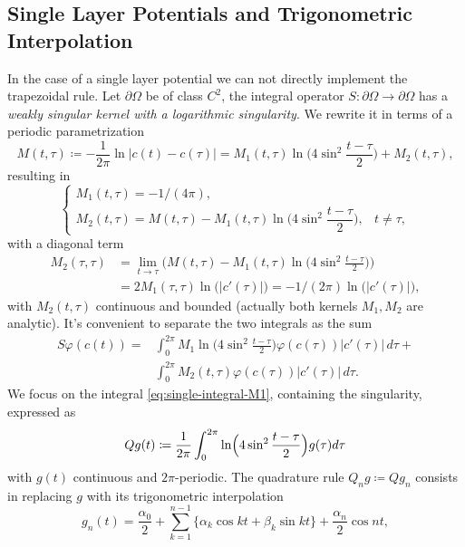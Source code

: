 \documentclass[10pt, a4paper, twoside, openright]{book}
\theoremstyle{definition}
\theoremstyle{plain}
\theoremstyle{plain}
\theoremstyle{plain}
\theoremstyle{plain}
\theoremstyle{plain}
\theoremstyle{plain}
\theoremstyle{plain}
\theoremstyle{plain}
\let\phi\varphi
\begin{document}
\subsection{Single Layer Potentials and Trigonometric Interpolation}
In the case of a single layer potential we can not directly implement the trapezoidal rule.
Let $\partial \Omega$ be of class $C^2$, the integral operator $S:\partial\Omega\to \partial\Omega$ has a \emph{weakly singular kernel with a logarithmic singularity}. We rewrite it in terms of a periodic parametrization
\begin{equation}
\label{eq:def-kernel-M}
 M(t,\tau)\coloneqq-\frac{1}{2\pi}\ln|c(t)-c(\tau)|=M_1(t,\tau)\ln\Big(4\sin^2\frac{t-\tau}{2}\Big)+M_2(t,\tau),
\end{equation}
resulting in
\begin{equation}
\begin{cases}
 M_1(t,\tau)= -1/(4\pi), \\
 M_2(t,\tau)=M(t,\tau) - M_1(t,\tau)\ln\Big(4\sin^2\dfrac{t-\tau}{2}\Big), & t\neq \tau,
\end{cases}
\end{equation}
with a diagonal term
\begin{align}
 M_2(\tau,\tau)&=\lim_{t\to\tau} \Big(M(t,\tau) - M_1(t,\tau)\ln\Big(4\sin^2\frac{t-\tau}{2}\Big)\Big) \\
 &=2M_1(\tau,\tau)\ln\big(|c'(\tau)|\big)=-1/(2\pi)\ln\big(|c'(\tau)|\big),
\end{align}
with $M_2(t,\tau)$ continuous and bounded (actually both kernels $M_1, M_2$ are analytic). It's convenient to separate the two integrals as the sum
\begin{align}
 S\phi(c(t)) =  &\int_0^{2\pi} M_1\ln\Big(4\sin^2\frac{t-\tau}{2}\Big)\phi(c(\tau))|c'(\tau)|\,d\tau + \label{eq:single-integral-M1}\\ 
                &\int_0^{2\pi} M_2(t,\tau)\phi(c(\tau))|c'(\tau)|\,d\tau \label{eq:single-integral-M2}.
\end{align}
We focus on the integral \eqref{eq:single-integral-M1}, containing the singularity, expressed as
\begin{equation}
 Qg(t)\coloneqq\frac{1}{2\pi}\int_0^{2\pi}\ln\Bigl(4\sin^2\frac{t-\tau}{2}\Bigr)g(\tau)d\tau
\end{equation}
with $g(t)$ continuous and $2\pi$-periodic. The quadrature rule 
$Q_ng\coloneqq Qg_n$ consists in replacing $g$ with its 
trigonometric interpolation 
\begin{equation}
 g_n(t)=\frac{\alpha_0}{2} + \sum_{k=1}^{n-1}\{\alpha_k\cos kt + \beta_k\sin kt\} + \frac{\alpha_n}{2}\cos nt,
\end{equation}
\end{document}
